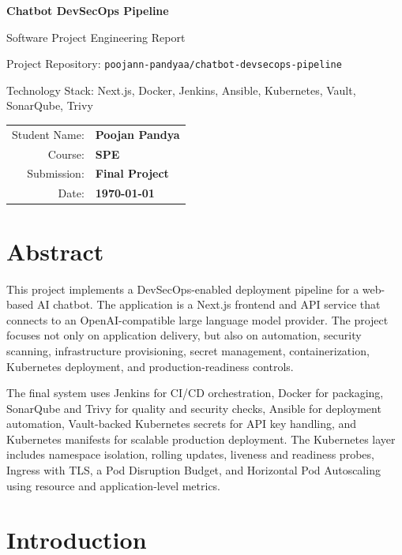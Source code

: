 \documentclass[12pt,a4paper]{article}
\begin{document}
\begin{titlepage}
    \centering
    \vspace*{1.2cm}
    {\Huge\bfseries Chatbot DevSecOps Pipeline\par}
    \vspace{0.4cm}
    {\Large Software Project Engineering Report\par}
    \vspace{1.2cm}
    {\large Project Repository: \texttt{poojann-pandyaa/chatbot-devsecops-pipeline}\par}
    \vspace{0.8cm}
    {\large Technology Stack: Next.js, Docker, Jenkins, Ansible, Kubernetes, Vault, SonarQube, Trivy\par}
    \vfill
    \begin{tabular}{rl}
        Student Name: & \textbf{Poojan Pandya} \\
        Course: & \textbf{SPE} \\
        Submission: & \textbf{Final Project} \\
        Date: & \textbf{\today}
    \end{tabular}
    \vfill
\end{titlepage}

\tableofcontents
\newpage

\section{Abstract}

This project implements a DevSecOps-enabled deployment pipeline for a web-based
AI chatbot. The application is a Next.js frontend and API service that connects
to an OpenAI-compatible large language model provider. The project focuses not
only on application delivery, but also on automation, security scanning,
infrastructure provisioning, secret management, containerization, Kubernetes
deployment, and production-readiness controls.

The final system uses Jenkins for CI/CD orchestration, Docker for packaging,
SonarQube and Trivy for quality and security checks, Ansible for deployment
automation, Vault-backed Kubernetes secrets for API key handling, and Kubernetes
manifests for scalable production deployment.
The Kubernetes layer includes namespace isolation, rolling updates, liveness and
readiness probes, Ingress with TLS, a Pod Disruption Budget, and Horizontal Pod
Autoscaling using resource and application-level metrics.

\section{Introduction}
\end{document}
